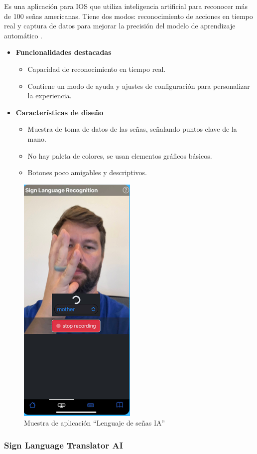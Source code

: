 Es una aplicación para IOS que utiliza inteligencia artificial para reconocer más de 100 señas americanas. Tiene dos modos: reconocimiento de acciones en tiempo real y captura de datos para mejorar la precisión del modelo de aprendizaje automático \cite{AISign2023}.

\begin{itemize}
    \item \textbf{Funcionalidades destacadas}
    \begin{itemize}
        \item Capacidad de reconocimiento en tiempo real.
        \item Contiene un modo de ayuda y ajustes de configuración para personalizar la experiencia.
    \end{itemize}

    \item \textbf{Características de diseño}
    \begin{itemize}
        \item Muestra de toma de datos de las señas, señalando puntos clave de la mano.
        \item No hay paleta de colores, se usan elementos gráficos básicos.
        \item Botones poco amigables y descriptivos.
    \end{itemize}
\end{itemize}

\begin{figure}[h]
    \centering
    \includegraphics[width=0.25\linewidth]{figuras/applenguasenasia.png}
    \caption{Muestra de aplicación “Lenguaje de señas IA”}
    \label{fig:enter-label}
\end{figure}


\subsubsection{Sign Language Translator AI}

